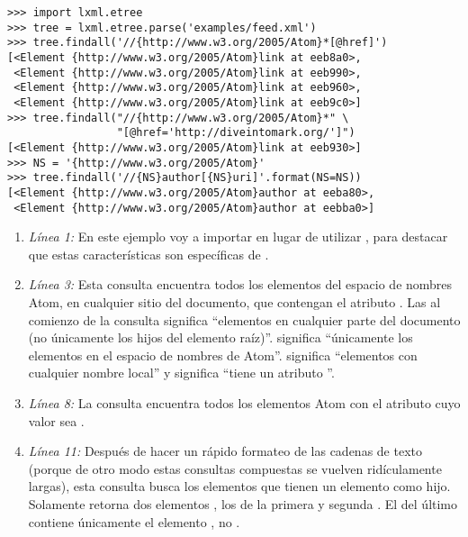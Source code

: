 \noindent\begin{minipage}{\textwidth}
\begin{lstlisting}[mathescape=True]
>>> import lxml.etree
>>> tree = lxml.etree.parse('examples/feed.xml')
>>> tree.findall('//{http://www.w3.org/2005/Atom}*[@href]')
[<Element {http://www.w3.org/2005/Atom}link at eeb8a0>,
 <Element {http://www.w3.org/2005/Atom}link at eeb990>,
 <Element {http://www.w3.org/2005/Atom}link at eeb960>,
 <Element {http://www.w3.org/2005/Atom}link at eeb9c0>]
>>> tree.findall("//{http://www.w3.org/2005/Atom}*" \
                 "[@href='http://diveintomark.org/']")
[<Element {http://www.w3.org/2005/Atom}link at eeb930>]
>>> NS = '{http://www.w3.org/2005/Atom}'
>>> tree.findall('//{NS}author[{NS}uri]'.format(NS=NS))
[<Element {http://www.w3.org/2005/Atom}author at eeba80>,
 <Element {http://www.w3.org/2005/Atom}author at eebba0>]
\end{lstlisting}
\end{minipage}

 \begin{enumerate}

\item \emph{Línea 1:} En este ejemplo voy a importar  en lugar de utilizar , para destacar que estas características son específicas de .

\item \emph{Línea 3:} Esta consulta encuentra todos los elementos del espacio de nombres Atom, en cualquier sitio del documento, que contengan el atributo . Las \codigo{//} al comienzo de la consulta significa ``elementos en cualquier parte del documento (no únicamente los hijos del elemento raíz)''.  significa ``únicamente los elementos en el espacio de nombres de Atom''. \codigo{*} significa ``elementos con cualquier nombre local'' y  significa ``tiene un atributo ''.

\item \emph{Línea 8:} La consulta encuentra todos los elementos Atom con el atributo  cuyo valor sea .

\item \emph{Línea 11:} Después de hacer un rápido formateo de las cadenas de texto (porque de otro modo estas consultas compuestas se vuelven ridículamente largas), esta consulta busca los elementos  que tienen un elemento  como hijo. Solamente retorna dos elementos , los de la primera y segunda . El  del último  contiene únicamente el elemento , no .

\end{enumerate}

